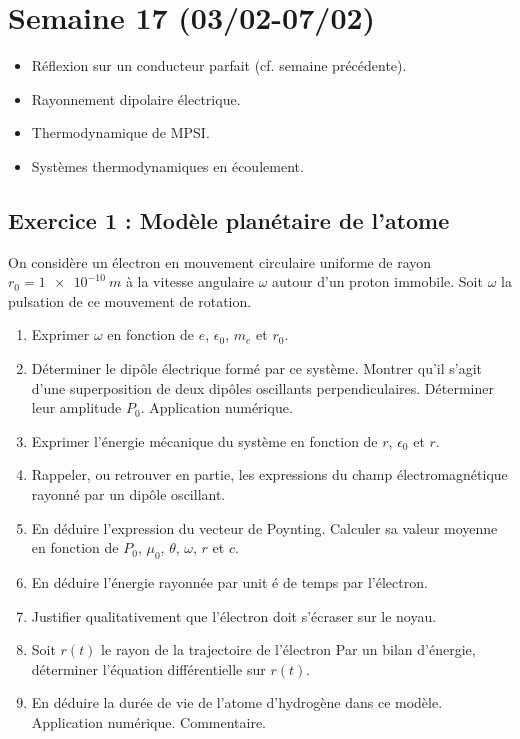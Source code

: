 \section{Semaine 17 (03/02-07/02) }

\begin{itemize}
	\item Réflexion sur un conducteur parfait (cf. semaine précédente).
	\item Rayonnement dipolaire électrique.
	\item Thermodynamique de MPSI.
	\item Systèmes thermodynamiques en écoulement.
\end{itemize}


\subsection{Exercice 1 : Modèle planétaire de l'atome}

On considère un électron en mouvement circulaire uniforme de rayon $r_0 = \SI{1e-10}{m}$ à la vitesse angulaire $\omega$ autour d'un proton immobile. Soit $\omega$ la pulsation de ce mouvement de rotation.

\begin{enumerate}
	\item Exprimer $\omega$ en fonction de $e$, $\epsilon_0$, $m_e$ et $r_0$.
	\item Déterminer le dipôle électrique formé par ce système. Montrer qu'il s'agit d'une superposition de deux dipôles oscillants perpendiculaires. Déterminer leur amplitude $P_0$. Application numérique.
	\item Exprimer l'énergie mécanique du système en fonction de $r$, $\epsilon_0$ et $r$.
	\item Rappeler, ou retrouver en partie, les expressions du champ électromagnétique rayonné par un dipôle oscillant.
	\item En déduire l'expression du vecteur de Poynting. Calculer sa valeur moyenne en fonction de $P_0$, $\mu_0$, $\theta$, $\omega$, $r$ et $c$.
	\item En déduire l'énergie rayonnée par unit é de temps par l'électron.
	\item Justifier qualitativement que l'électron doit s'écraser sur le noyau. 
	\item Soit $r(t)$ le rayon de la trajectoire de l'électron Par un bilan d'énergie, déterminer l'équation différentielle sur $r(t)$.  
	\item En déduire la durée de vie de l'atome d'hydrogène dans ce modèle. Application numérique. Commentaire.
\end{enumerate}

